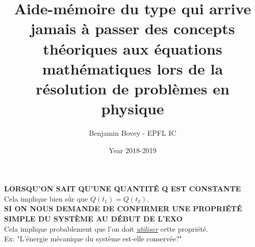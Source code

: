 \documentclass{article}
\title{Aide-mémoire du type qui arrive jamais à passer des concepts théoriques aux équations mathématiques lors de la résolution de problèmes en physique}
\author{Benjamin Bovey - EPFL IC}
\date{Year 2018-2019}
\begin{document}
\maketitle

\textbf{LORSQU'ON SAIT QU'UNE QUANTITÉ Q EST CONSTANTE} \\
Cela implique bien sûr que \(\boxed{Q(t_1) = Q(t_2)}\). \\

\textbf{SI ON NOUS DEMANDE DE CONFIRMER UNE PROPRIÉTÉ SIMPLE DU SYSTÈME AU DÉBUT DE L'EXO} \\
Cela implique probablement que l'on doit \underline{\emph{utiliser}} cette propriété. \\
Ex: "L'énergie mécanique du système est-elle conservée?"
\end{document}
